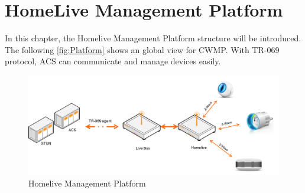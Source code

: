 
\chapter{HomeLive Management Platform} %

\label{Chapter4} %


In this chapter, the Homelive Management Platform structure will be introduced. The following \autoref{fig:Platform} shows an global view for CWMP. With TR-069 protocol, ACS can communicate and manage devices easily.
\begin{figure}[htbp]
	\centering
		\includegraphics[width=12cm]{Figures/Homelive_Management_Platform.png}
	\caption[Homelive Management Platform]{Homelive Management Platform}
	\label{fig:Platform}
\end{figure}

